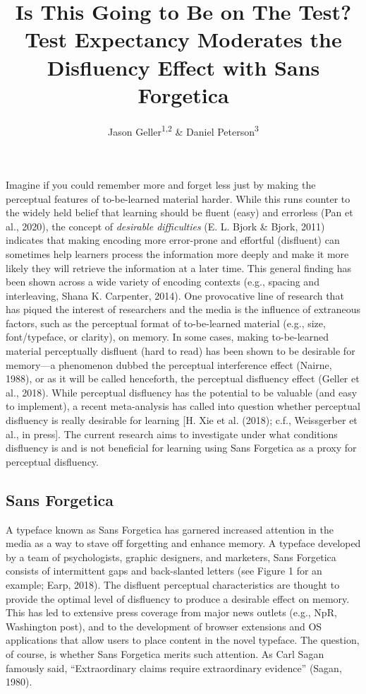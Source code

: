 \documentclass[
  english,
  jou]{apa7}
\title{Is This Going to Be on The Test? Test Expectancy Moderates the Disfluency Effect with Sans Forgetica}
\author{Jason Geller\textsuperscript{1,2} \& Daniel Peterson\textsuperscript{3}}
\date{}
\affiliation{\vspace{0.5cm}\textsuperscript{1} University of Iowa\\\textsuperscript{2} Rutgers University Center for Cognitive Science\\\textsuperscript{3} Skidmore College}
\begin{document}
\maketitle

Imagine if you could remember more and forget less just by making the perceptual features of to-be-learned material harder. While this runs counter to the widely held belief that learning should be fluent (easy) and errorless (Pan et al., 2020), the concept of \emph{desirable difficulties} (E. L. Bjork \& Bjork, 2011) indicates that making encoding more error-prone and effortful (disfluent) can sometimes help learners process the information more deeply and make it more likely they will retrieve the information at a later time. This general finding has been shown across a wide variety of encoding contexts (e.g., spacing and interleaving, Shana K. Carpenter, 2014). One provocative line of research that has piqued the interest of researchers and the media is the influence of extraneous factors, such as the perceptual format of to-be-learned material (e.g., size, font/typeface, or clarity), on memory. In some cases, making to-be-learned material perceptually disfluent (hard to read) has been shown to be desirable for memory---a phenomenon dubbed the perceptual interference effect (Nairne, 1988), or as it will be called henceforth, the perceptual disfluency effect (Geller et al., 2018). While perceptual disfluency has the potential to be valuable (and easy to implement), a recent meta-analysis has called into question whether perceptual disfluency is really desirable for learning {[}H. Xie et al. (2018); c.f., Weissgerber et al., in press{]}. The current research aims to investigate under what conditions disfluency is and is not beneficial for learning using Sans Forgetica as a proxy for perceptual disfluency.

\hypertarget{sans-forgetica}{%
\subsection{Sans Forgetica}\label{sans-forgetica}}

A typeface known as Sans Forgetica has garnered increased attention in the media as a way to stave off forgetting and enhance memory. A typeface developed by a team of psychologists, graphic designers, and marketers, Sans Forgetica consists of intermittent gaps and back-slanted letters (see Figure 1 for an example; Earp, 2018). The disfluent perceptual characteristics are thought to provide the optimal level of disfluency to produce a desirable effect on memory. This has led to extensive press coverage from major news outlets (e.g., NpR, Washington post), and to the development of browser extensions and OS applications that allow users to place content in the novel typeface. The question, of course, is whether Sans Forgetica merits such attention. As Carl Sagan famously said, ``Extraordinary claims require extraordinary evidence'' (Sagan, 1980).
\end{document}
